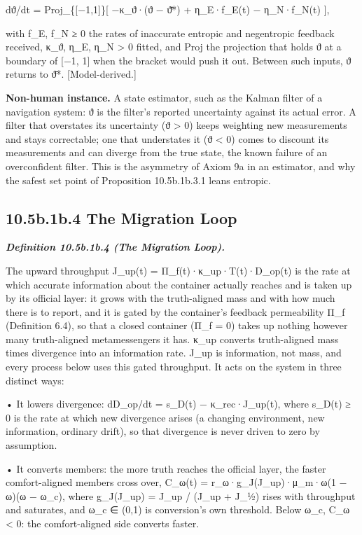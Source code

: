 \documentclass[
]{article}
\begin{document}
dϑ/dt = Proj\_\{{[}−1,1{]}\}{[} −κ\_ϑ·(ϑ − ϑ̄*) + η\_E·f\_E(t) −
η\_N·f\_N(t) {]},

with f\_E, f\_N ≥ 0 the rates of inaccurate entropic and negentropic
feedback received, κ\_ϑ, η\_E, η\_N \textgreater{} 0 fitted, and Proj
the projection that holds ϑ at a boundary of {[}−1, 1{]} when the
bracket would push it out. Between such inputs, ϑ returns to ϑ̄*.
{[}Model-derived.{]}

\textbf{Non-human instance.} A state estimator, such as the Kalman
filter of a navigation system: ϑ is the filter's reported uncertainty
against its actual error. A filter that overstates its uncertainty (ϑ
\textgreater{} 0) keeps weighting new measurements and stays
correctable; one that understates it (ϑ \textless{} 0) comes to discount
its measurements and can diverge from the true state, the known failure
of an overconfident filter. This is the asymmetry of Axiom 9a in an
estimator, and why the safest set point of Proposition 10.5b.1b.3.1
leans entropic.

\hypertarget{b.1b.4-the-migration-loop}{%
\subsection{10.5b.1b.4 The Migration
Loop}\label{b.1b.4-the-migration-loop}}

\emph{\textbf{Definition 10.5b.1b.4 (The Migration Loop).}}

The upward throughput J\_up(t) = Π\_f(t)·κ\_up·T(t)·D\_op(t) is the rate
at which accurate information about the container actually reaches and
is taken up by its official layer: it grows with the truth-aligned mass
and with how much there is to report, and it is gated by the container's
feedback permeability Π\_f (Definition 6.4), so that a closed container
(Π\_f = 0) takes up nothing however many truth-aligned metamessengers it
has. κ\_up converts truth-aligned mass times divergence into an
information rate. J\_up is information, not mass, and every process
below uses this gated throughput. It acts on the system in three
distinct ways:

• It lowers divergence: dD\_op/dt = s\_D(t) − κ\_rec·J\_up(t), where
s\_D(t) ≥ 0 is the rate at which new divergence arises (a changing
environment, new information, ordinary drift), so that divergence is
never driven to zero by assumption.

• It converts members: the more truth reaches the official layer, the
faster comfort-aligned members cross over, C\_ω(t) =
r\_ω·g\_J(J\_up)·μ\_m·ω(1 − ω)(ω − ω\_c), where g\_J(J\_up) = J\_up /
(J\_up + J\_½) rises with throughput and saturates, and ω\_c ∈ (0,1) is
conversion's own threshold. Below ω\_c, C\_ω \textless{} 0: the
comfort-aligned side converts faster.
\end{document}

